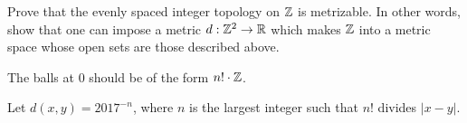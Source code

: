 \begin{problem}
	\gim
	Prove that the evenly spaced integer topology on $\mathbb Z$ is metrizable.
	In other words, show that one can impose a metric $d : \mathbb Z^2 \to \mathbb R$
	which makes $\mathbb Z$ into a metric space whose open sets are those described above.
	\begin{hint}
		The balls at $0$ should be of the form $n! \cdot \mathbb Z$.
	\end{hint}
	\begin{sol}
		Let $d(x,y) = 2017^{-n}$,
		where $n$ is the largest integer
		such that $n!$ divides $\left\lvert x-y \right\rvert$.
	\end{sol}
\end{problem}
